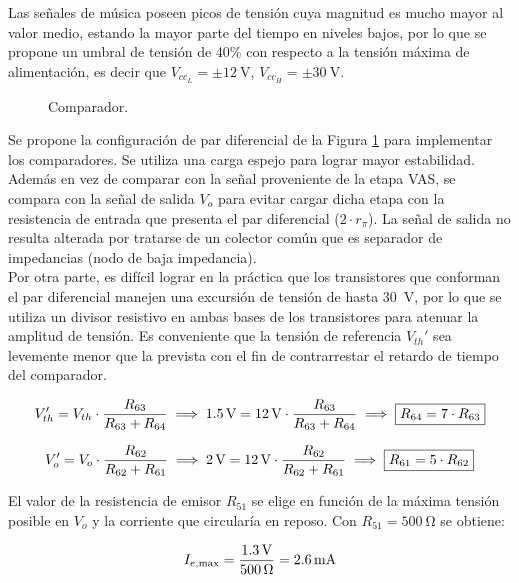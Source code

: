 	Las señales de música poseen picos de tensión cuya magnitud es mucho mayor al valor medio, estando la mayor parte del tiempo en niveles bajos, por lo que se propone un umbral de tensión de 40\% con respecto a la tensión máxima de alimentación, es decir que $V_{cc_L} = \pm \SI{12}{\volt}$, $V_{cc_H} = \pm \SI{30}{\volt}$.

	\begin{figure}[H]
		\centering
		\scalebox{0.5}{}
		\caption{Comparador.}
		\label{fig.comparador}
	\end{figure}

	Se propone la configuración de par diferencial de la Figura \ref{fig.comparador} para implementar los comparadores. Se utiliza una carga espejo para lograr mayor estabilidad. Además en vez de comparar con la señal proveniente de la etapa VAS, se compara con la señal de salida $V_{o}$ para evitar cargar dicha etapa con la resistencia de entrada que presenta el par diferencial ($2\cdot r_\pi$). La señal de salida no resulta alterada por tratarse de un colector común que es separador de impedancias (nodo de baja impedancia).\\
	\indent Por otra parte, es difícil lograr en la práctica que los transistores que conforman el par diferencial manejen una excursión de tensión de hasta \SI{30}{\volt}, por lo que se utiliza un divisor resistivo en ambas bases de los transistores para atenuar la amplitud de tensión. Es conveniente que la tensión de referencia $V_{th}'$ sea levemente menor que la prevista con el fin de contrarrestar el retardo de tiempo del comparador.

\begin{equation}
	\centering
	V_{th}' = V_{th} \cdot \frac{R_{63}}{R_{63} + R_{64}} \implies \SI{1.5}{\volt} = \SI{12}{\volt} \cdot \frac{R_{63}}{R_{63} + R_{64}} \implies \boxed{R_{64} = 7 \cdot R_{63}}
\end{equation}

\begin{equation}
	\centering
	V_o' = V_o \cdot \frac{R_{62}}{R_{62} + R_{61}} \implies \SI{2}{\volt} = \SI{12}{\volt} \cdot \frac{R_{62}}{R_{62} + R_{61}} \implies \boxed{R_{61} = 5 \cdot R_{62}}
	\end{equation}

	El valor de la resistencia de emisor $R_{51}$ se elige en función de la máxima tensión posible en $V_o$ y la corriente que circularía en reposo. Con $R_{51} = \SI{500}{\ohm}$ se obtiene:

	\begin{equation}
		\centering
		I_{e,\max} = \frac{ \SI{1.3}{\volt} }{ \SI{500}{\ohm} } = \SI{2.6}{\milli\ampere}
	\end{equation}


